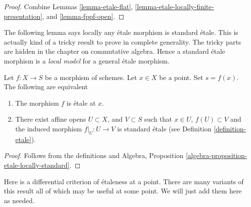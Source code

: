\begin{proof}
Combine Lemmas \ref{lemma-etale-flat},
\ref{lemma-etale-locally-finite-presentation}, and
\ref{lemma-fppf-open}.
\end{proof}

\noindent
The following lemma says locally any \'etale morphism is standard \'etale.
This is actually kind of a tricky result to prove in complete generality.
The tricky parts are hidden in the chapter on commutative algebra.
Hence a standard \'etale morphism is a {\it local model} for a general
\'etale morphism.

\begin{lemma}
\label{lemma-etale-locally-standard-etale}
Let $f : X  \to S$ be a morphism of schemes.
Let $x \in X$ be a point.
Set $s = f(x)$.
The following are equivalent
\begin{enumerate}
\item The morphism $f$ is \'etale at $x$.
\item There exist affine opens $U \subset X$,
and $V \subset S$ such that $x \in U$, $f(U) \subset V$ and the
induced morphism $f|_U : U \to V$ is standard \'etale
(see Definition \ref{definition-etale}).
\end{enumerate}
\end{lemma}

\begin{proof}
Follows from the definitions and
Algebra, Proposition \ref{algebra-proposition-etale-locally-standard}.
\end{proof}

\noindent
Here is a differential criterion of \'etaleness at a point.
There are many variants of this result
all of which may be useful at some point. We will just add them
here as needed.

